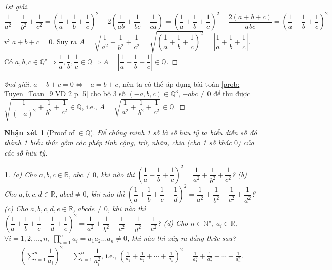 \documentclass{article}
\newtheorem{baitoan}{}%
\newtheorem{nhanxet}{Nhận xét}
\begin{document}
\begin{proof}[1st giải]
	$\dfrac{1}{a^2} + \dfrac{1}{b^2} + \dfrac{1}{c^2} = \left(\dfrac{1}{a} + \dfrac{1}{b} + \dfrac{1}{c}\right)^2 - 2\left(\dfrac{1}{ab} + \dfrac{1}{bc} + \dfrac{1}{ca}\right) = \left(\dfrac{1}{a} + \dfrac{1}{b} + \dfrac{1}{c}\right)^2 - \dfrac{2(a + b + c)}{abc} = \left(\dfrac{1}{a} + \dfrac{1}{b} + \dfrac{1}{c}\right)^2$ vì $a + b + c = 0$. Suy ra $A = \sqrt{\dfrac{1}{a^2} + \dfrac{1}{b^2} + \dfrac{1}{c^2}} = \sqrt{\left(\dfrac{1}{a} + \dfrac{1}{b} + \dfrac{1}{c}\right)^2} = \left|\dfrac{1}{a} + \dfrac{1}{b} + \dfrac{1}{c}\right|$. Có $a,b,c\in\mathbb{Q}^\star\Rightarrow\dfrac{1}{a},\dfrac{1}{b},\dfrac{1}{c}\in\mathbb{Q}\Rightarrow A =\left|\dfrac{1}{a} + \dfrac{1}{b} + \dfrac{1}{c}\right|\in\mathbb{Q}$.
\end{proof}

\begin{proof}[2nd giải]
	$a + b + c = 0\Leftrightarrow -a = b + c$, nên ta có thể áp dụng bài toán \ref{prob: Tuyen_Toan_9 VD 2 p. 5} cho bộ 3 số $(-a,b,c)\in\mathbb{Q}^3$, $-abc\ne0$ để thu được $\sqrt{\dfrac{1}{(-a)^2} + \dfrac{1}{b^2} + \dfrac{1}{c^2}}\in\mathbb{Q}$, i.e., $A = \sqrt{\dfrac{1}{a^2} + \dfrac{1}{b^2} + \dfrac{1}{c^2}}\in\mathbb{Q}$.
\end{proof}

\begin{nhanxet}[Proof of $\in\mathbb{Q}$]
	Để chứng minh 1 số là số hữu tỷ ta biểu diễn số đó thành 1 biểu thức gồm các phép tính cộng, trừ, nhân, chia (cho 1 số khác $0$) của các số hữu tỷ.
\end{nhanxet}

\begin{baitoan}
	(a) Cho $a,b,c\in\mathbb{R}$, $abc\ne0$, khi nào thì $\left(\dfrac{1}{a} + \dfrac{1}{b} + \dfrac{1}{c}\right)^2 = \dfrac{1}{a^2} + \dfrac{1}{b^2} + \dfrac{1}{c^2}$? (b) Cho $a,b,c,d\in\mathbb{R}$, $abcd\ne0$, khi nào thì $\left(\dfrac{1}{a} + \dfrac{1}{b} + \dfrac{1}{c} + \dfrac{1}{d}\right)^2 = \dfrac{1}{a^2} + \dfrac{1}{b^2} + \dfrac{1}{c^2} + \dfrac{1}{d^2}$? (c) Cho $a,b,c,d,e\in\mathbb{R}$, $abcde\ne0$, khi nào thì $\left(\dfrac{1}{a} + \dfrac{1}{b} + \dfrac{1}{c} + \dfrac{1}{d} + \dfrac{1}{e}\right)^2 = \dfrac{1}{a^2} + \dfrac{1}{b^2} + \dfrac{1}{c^2} + \dfrac{1}{d^2} + \dfrac{1}{e^2}$? (d) Cho $n\in\mathbb{N}^\star$, $a_i\in\mathbb{R}$, $\forall i = 1,2,\ldots,n$, $\prod_{i=1}^n a_i = a_1a_2\ldots a_n\ne0$, khi nào thì xảy ra đẳng thức sau?
	\begin{align*}
		\left(\sum_{i=1}^n \dfrac{1}{a_i}\right)^2 = \sum_{i=1}^n \dfrac{1}{a_i^2}\mbox{, i.e., } \left(\frac{1}{a_1} + \frac{1}{a_2} + \cdots + \frac{1}{a_n}\right)^2 = \frac{1}{a_1^2} + \frac{1}{a_2^2} + \cdots + \frac{1}{a_n^2}.
	\end{align*}
\end{baitoan}
\end{document}
